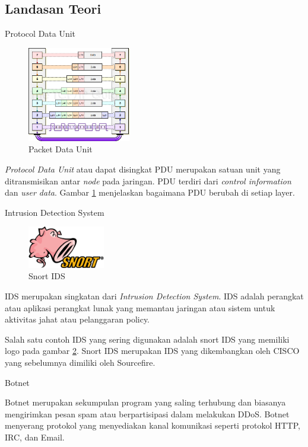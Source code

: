 \documentclass[t]{beamer}
\begin{document}
\subsection{Landasan Teori}
\begin{frame}{Protocol Data Unit}
	\begin{figure}[H]
		\centering
		\includegraphics[width=0.4\textwidth]{public/assets/img/osidataenkapsulasi.png}
		\caption{Packet Data Unit}
		\label{fig:pduosi}
	\end{figure}
	\par \textit{Protocol Data Unit} atau dapat disingkat PDU merupakan satuan unit yang ditransmisikan antar \textit{node} pada jaringan. PDU terdiri dari \textit{control information} dan \textit{user data}. Gambar \ref{fig:pduosi} menjelaskan bagaimana PDU berubah di setiap layer.
\end{frame}
\begin{frame}{Intrusion Detection System}
	\begin{figure}
		\centering
		\includegraphics[width=0.3\textwidth]{public/assets/img/snortlogo.png}
		\caption{Snort IDS}
		\label{fig:snortids}
	\end{figure}
	\par IDS merupakan singkatan dari \textit{Intrusion Detection System}. IDS adalah perangkat atau aplikasi perangkat lunak yang memantau jaringan atau sistem untuk aktivitas jahat atau pelanggaran policy.
	\par Salah satu contoh IDS yang sering digunakan adalah snort IDS yang memiliki logo pada gambar \ref{fig:snortids}. Snort IDS merupakan IDS yang dikembangkan oleh CISCO yang sebelumnya dimiliki oleh Sourcefire. \cite{greenemeier2006sourcefire}
\end{frame}
\begin{frame}{Botnet}
	\par Botnet merupakan sekumpulan program yang saling terhubung dan biasanya mengirimkan pesan spam atau berpartisipasi dalam melakukan DDoS. Botnet menyerang protokol yang menyediakan kanal komunikasi seperti protokol HTTP, IRC, dan Email.
\end{frame}
\end{document}
